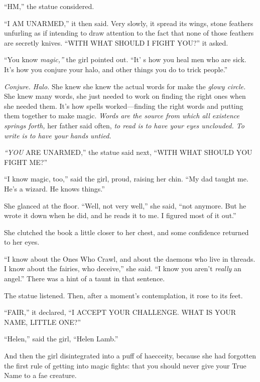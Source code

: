 ``HM,'' the statue considered.

``I AM UNARMED,'' it then said. Very slowly, it spread its wings, stone feathers unfurling as if intending to draw attention to the fact that none of those feathers are secretly knives. ``WITH WHAT SHOULD I FIGHT YOU?'' it asked.

``You know \emph{magic,''} the girl pointed out. ``It' s how you heal men who
are sick. It's how you conjure your halo, and other things you do to trick people.''

\emph{Conjure. Halo.} She knew she knew the actual words for make the \emph{glowy circle.} She knew many words, she just needed to work on finding the right ones when she needed them. It's how spells worked---finding the right words and putting them together to make magic. \emph{Words are the source from which all existence springs forth,} her father said often, \emph{to read is to have your eyes unclouded. To write is to have your hands untied.}

\emph{``YOU} ARE UNARMED,'' the statue said next, ``WITH WHAT SHOULD YOU FIGHT ME?''

``I know magic, too,'' said the girl, proud, raising her chin. ``My dad taught me. He's a wizard. He knows things.''

She glanced at the floor. ``Well, not very well,'' she said, ``not anymore. But he wrote it down when he did, and he reads it to me. I figured most of it out.''

She clutched the book a little closer to her chest, and some confidence returned to her eyes.

``I know about the Ones Who Crawl, and about the daemons who live in threads. I know
about the fairies, who deceive,'' she said. ``I know you aren't \emph{really} an angel.''
There was a hint of a taunt in that sentence.

The statue listened. Then, after a moment's contemplation, it rose to its feet.

``FAIR,'' it declared, ``I ACCEPT YOUR CHALLENGE. WHAT IS YOUR NAME, LITTLE ONE?''

``Helen,'' said the girl, ``Helen Lamb.''

And then the girl disintegrated into a puff of haecceity, because she had forgotten the first rule of getting into magic fights: that
you should never give your True Name to a fae creature.

